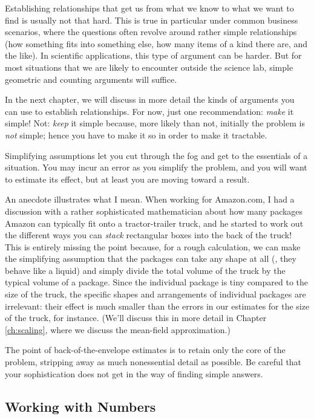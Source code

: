 Establishing relationships that get us from what we know to what we
want to find is usually not that hard.  This is true in particular
under common business scenarios, where the questions often revolve
around rather simple relationships (how something fits into something
else, how many items of a kind there are, and the like). In scientific
applications, this type of argument can be harder. But for most
situations that we are likely to encounter outside the science lab,
simple geometric and counting arguments will suffice.
    
In the next chapter, we will discuss in more detail the kinds of
arguments you can use to establish relationships. For now, just one
recommendation: \emph{make} it simple! Not: \emph{keep} it simple
because, more likely than not, initially the problem is \emph{not}
simple; hence you have to make it so in order to make it tractable.
    
Simplifying assumptions let you cut through the fog and get to the
essentials of a situation. You may incur an error as you simplify the
problem, and you will want to estimate its effect, but at least you are
moving toward a result.

An anecdote illustrates what I mean. When working for Amazon.com, I
had a discussion with  a rather sophisticated mathematician about how
many packages Amazon can typically fit onto a tractor-trailer truck,
and he started to work out the different ways you can \emph{stack}
rectangular boxes into the back of the truck! This is entirely missing
the point because, for a rough calculation, we can make the
simplifying assumption that the packages can take any shape at all
(\ie, they behave like a liquid) and simply divide the total volume of
the truck by the typical volume of a package. Since the individual
package is tiny compared to the size of the truck, the specific shapes
and arrangements of individual packages are irrelevant: their effect
is much smaller than the errors in our estimates for the size of the
truck, for instance. (We'll discuss this in more detail in Chapter
\ref{ch:scaling}, where we discuss the mean-field approximation.)

The point of back-of-the-envelope estimates is to retain only the core
of the problem, stripping away as much nonessential detail as
possible. Be careful that your sophistication does not get in the way
of finding simple answers.

\subsection{Working with Numbers}
  
